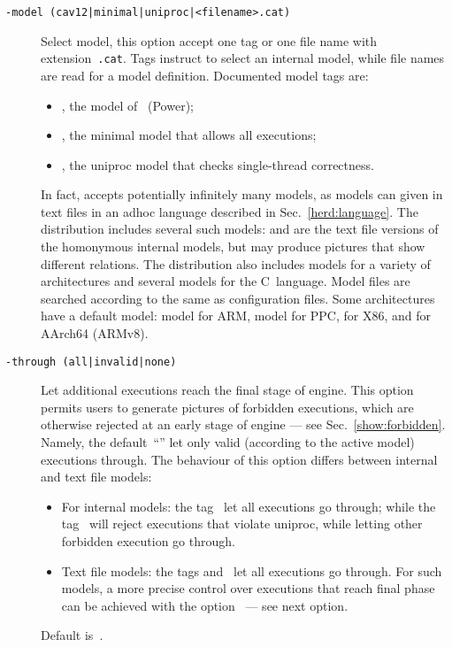 \begin{description}
\item[{\tt -model (cav12|minimal|uniproc|<filename>.cat)}]
Select model, this option accept one tag or one file name
with extension~\texttt{.cat}.
Tags instruct \herd{} to select an internal model,
while file names are read for a model definition.
Documented model tags are:
\begin{itemize}
\item {}, the model of~\cite{mms12} (Power);
\item {}, the minimal model that allows all executions;
\item {}, the uniproc model that checks single-thread correctness.
\end{itemize}

In fact, \herd{} accepts potentially infinitely many models,
as models can given in text files in an adhoc language described in
Sec.~\ref{herd:language}.
The \herd{} distribution includes several such models:
 and 
are the text file versions of the homonymous internal models, but may
produce pictures that show different relations.
The \herd{} distribution also includes models for a variety of architectures
and several models for the C~language.
Model files are searched according to  the same
as configuration files.
Some architectures have a default model:
 model for ARM,  model for PPC,
 for X86, and  for AArch64 (ARMv8).

\item[{\tt -through (all|invalid|none)}]
Let additional executions reach the final stage of \herd{} engine.
This option permits users to generate pictures of forbidden executions, which
are otherwise rejected at an early stage of \herd{} engine --- see Sec.~\ref{show:forbidden}.
Namely, the default~``'' let only valid (according to the
active model) executions through.
The behaviour of this option differs between internal and text file models:
\begin{itemize}
\item For internal models:
the tag~ let all executions go through;
while the tag~ will reject executions that violate uniproc,
while letting other forbidden execution go through.
\item Text file models: the tags  and~ let all
executions go through. For such models, a more precise control over
executions that reach \herd{} final phase can be achieved
with the option~ --- see  next option.
\end{itemize}
Default is~.


\end{description}
